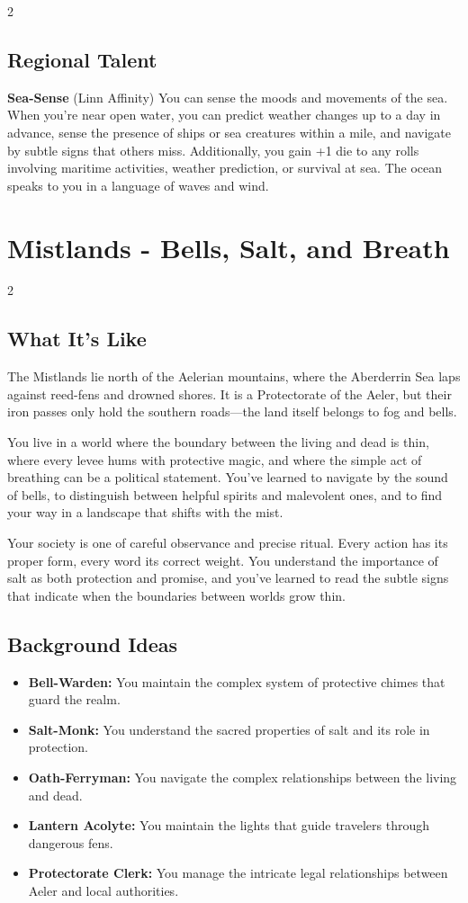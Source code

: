 \documentclass[11pt]{article}
\newcommand{\region}[1]{\section*{#1}}
\newcommand{\subregion}[1]{\subsection*{#1}}
\begin{document}
\begin{multicols}{2}
\subregion{Regional Talent}

\textbf{Sea-Sense} (Linn Affinity)
You can sense the moods and movements of the sea. When you're near open water, you can predict weather changes up to a day in advance, sense the presence of ships or sea creatures within a mile, and navigate by subtle signs that others miss. Additionally, you gain +1 die to any rolls involving maritime activities, weather prediction, or survival at sea. The ocean speaks to you in a language of waves and wind.

\end{multicols}

\region{Mistlands - Bells, Salt, and Breath}

\begin{multicols}{2}
\subregion{What It's Like}

The Mistlands lie north of the Aelerian mountains, where the Aberderrin Sea laps against reed-fens and drowned shores. It is a Protectorate of the Aeler, but their iron passes only hold the southern roads---the land itself belongs to fog and bells.

You live in a world where the boundary between the living and dead is thin, where every levee hums with protective magic, and where the simple act of breathing can be a political statement. You've learned to navigate by the sound of bells, to distinguish between helpful spirits and malevolent ones, and to find your way in a landscape that shifts with the mist.

Your society is one of careful observance and precise ritual. Every action has its proper form, every word its correct weight. You understand the importance of salt as both protection and promise, and you've learned to read the subtle signs that indicate when the boundaries between worlds grow thin.

\columnbreak

\subregion{Background Ideas}

\begin{itemize}[leftmargin=*]
    \item \textbf{Bell-Warden:} You maintain the complex system of protective chimes that guard the realm.
    \item \textbf{Salt-Monk:} You understand the sacred properties of salt and its role in protection.
    \item \textbf{Oath-Ferryman:} You navigate the complex relationships between the living and dead.
    \item \textbf{Lantern Acolyte:} You maintain the lights that guide travelers through dangerous fens.
    \item \textbf{Protectorate Clerk:} You manage the intricate legal relationships between Aeler and local authorities.
\end{itemize}


\end{multicols}
\end{document}
